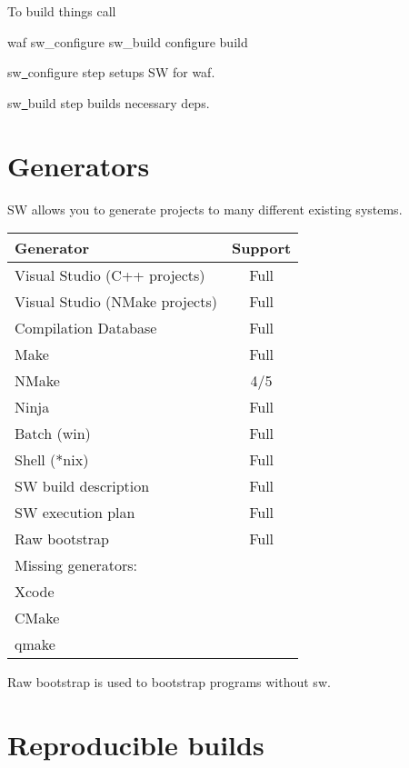 To build things call

\begin{command}
waf sw_configure sw_build configure build
\end{command}

sw\underline\ configure step setups SW for waf.

sw\underline\ build step builds necessary deps.





\section{Generators}

SW allows you to generate projects to many different existing systems.

\begin{center}
\begin{tabular}{lc}
Generator & Support\\
\hline
Visual Studio (C++ projects) & Full \\
Visual Studio (NMake projects) & Full \\
Compilation Database & Full \\
Make & Full \\
NMake & 4/5 \\ %
Ninja & Full \\
Batch (win) & Full \\
Shell (*nix) & Full \\
SW build description & Full \\
SW execution plan & Full \\
Raw bootstrap & Full \\
\hline

Missing generators: & \\
Xcode & \\
CMake & \\
qmake & \\

\hline
\end{tabular}
\end{center}


Raw bootstrap is used to bootstrap programs without sw.


\section{Reproducible builds}

